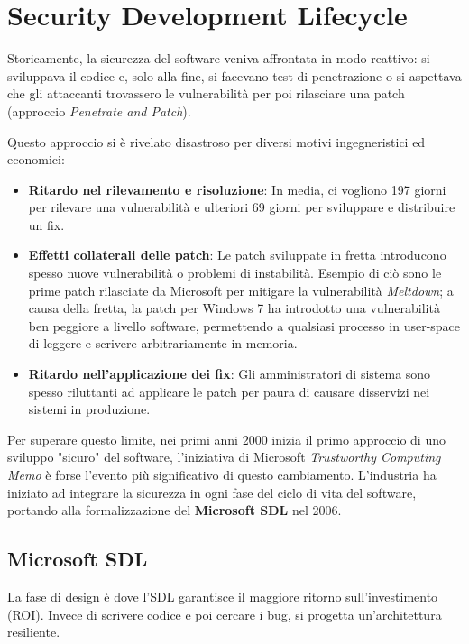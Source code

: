 \chapter{Security Development Lifecycle}

Storicamente, la sicurezza del software veniva affrontata in modo reattivo: si 
sviluppava il codice e, solo alla fine, si facevano test di penetrazione o si 
aspettava che gli attaccanti trovassero le vulnerabilità per poi rilasciare una 
patch (approccio \textit{Penetrate and Patch}).

Questo approccio si è rivelato disastroso per diversi motivi ingegneristici ed 
economici:

\begin{itemize}
    \item \textbf{Ritardo nel rilevamento e risoluzione}: In media, ci vogliono 197 giorni 
    per rilevare una vulnerabilità e ulteriori 69 giorni per sviluppare e distribuire un fix.
    \item \textbf{Effetti collaterali delle patch}: Le patch sviluppate in fretta 
    introducono spesso nuove vulnerabilità o problemi di instabilità. Esempio di ciò 
    sono le prime patch rilasciate da Microsoft per mitigare la vulnerabilità 
    \textit{Meltdown}; a causa della fretta, la patch per Windows 7 ha introdotto 
    una vulnerabilità ben peggiore a livello software, permettendo a qualsiasi 
    processo in user-space di leggere e scrivere arbitrariamente in memoria.
    \item \textbf{Ritardo nell'applicazione dei fix}: Gli amministratori di sistema 
    sono spesso riluttanti ad applicare le patch per paura di causare disservizi 
    nei sistemi in produzione.
\end{itemize}

Per superare questo limite, nei primi anni 2000 inizia il primo approccio di uno 
sviluppo "sicuro" del software, l'iniziativa di Microsoft \textit{Trustworthy Computing Memo} 
è forse l'evento più significativo di questo cambiamento. L'industria ha iniziato ad 
integrare la sicurezza in ogni fase del ciclo di vita del software, portando alla 
formalizzazione del \textbf{Microsoft SDL} nel 2006.

\section{Microsoft SDL}

La fase di design è dove l'SDL garantisce il maggiore ritorno sull'investimento (ROI). 
Invece di scrivere codice e poi cercare i bug, si progetta un'architettura resiliente.

